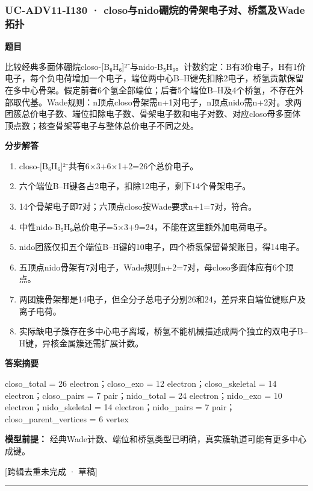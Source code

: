 \documentclass[UTF8,11pt,a4paper]{ctexart}
\begin{document}
\subsubsection*{UC-ADV11-I130 · closo与nido硼烷的骨架电子对、桥氢及Wade拓扑}
\noindent\textbf{题目}\par
比较经典多面体硼烷closo-[B₆H₆]²⁻与nido-B₅H₉。计数约定：B有3价电子，H有1价电子，每个负电荷增加一个电子，端位两中心B–H键先扣除2电子，桥氢贡献保留在多中心骨架。假定前者6个氢全部端位；后者5个端位B–H及4个桥氢，不存在外部取代基。Wade规则：n顶点closo骨架需n+1对电子，n顶点nido需n+2对。求两团簇总价电子数、端位扣除电子数、骨架电子数和电子对数、对应closo母多面体顶点数；核查骨架等电子与整体总价电子不同之处。\par
\medskip\noindent\textbf{分步解答}
\begin{enumerate}
\item closo-[B₆H₆]²⁻共有6×3+6×1+2=26个总价电子。
\item 六个端位B–H键各占2电子，扣除12电子，剩下14个骨架电子。
\item 14个骨架电子即7对；六顶点closo按Wade要求n+1=7对，符合。
\item 中性nido-B₅H₉总价电子=5×3+9=24，不能在这里额外加电荷电子。
\item nido团簇仅扣五个端位B–H键的10电子，四个桥氢保留骨架账目，得14电子。
\item 五顶点nido骨架有7对电子，Wade规则n+2=7对，母closo多面体应有6个顶点。
\item 两团簇骨架都是14电子，但全分子总电子分别26和24，差异来自端位键账户及离子电荷。
\item 实际缺电子簇存在多中心电子离域，桥氢不能机械描述成两个独立的双电子B–H键，异核金属簇还需扩展计数。
\end{enumerate}
\noindent\textbf{答案摘要}\par
closo\_total = 26 electron；closo\_exo = 12 electron；closo\_skeletal = 14 electron；closo\_pairs = 7 pair；nido\_total = 24 electron；nido\_exo = 10 electron；nido\_skeletal = 14 electron；nido\_pairs = 7 pair；closo\_parent\_vertices = 6 vertex\par
\noindent\textbf{模型前提：}
经典Wade计数、端位和桥氢类型已明确，真实簇轨道可能有更多中心成键。\par
\noindent\textcolor{red!65!black}{[跨辑去重未完成 · 草稿]} \par
\medskip\hrule\medskip
{}
\end{document}

